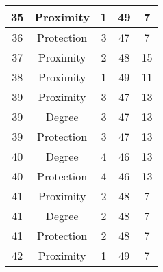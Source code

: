 \documentclass[results.tex]{subfiles}
\begin{document}
\begin{center}
\begin{tabular}{| c || c | c | c | c |}
            \hline
            35                      & Proximity                    & 1                      & 49                      & 7                    \\
            \hline
            36                      & Protection                   & 3                      & 47                      & 7                    \\
            \hline
            37                      & Proximity                    & 2                      & 48                      & 15                   \\
            \hline
            38                      & Proximity                    & 1                      & 49                      & 11                   \\
            \hline
            39                      & Proximity                    & 3                      & 47                      & 13                   \\
            \hline
            39                      & Degree                       & 3                      & 47                      & 13                   \\
            \hline
            39                      & Protection                   & 3                      & 47                      & 13                   \\
            \hline
            40                      & Degree                       & 4                      & 46                      & 13                   \\
            \hline
            40                      & Protection                   & 4                      & 46                      & 13                   \\
            \hline
            41                      & Proximity                    & 2                      & 48                      & 7                    \\
            \hline
            41                      & Degree                       & 2                      & 48                      & 7                    \\
            \hline
            41                      & Protection                   & 2                      & 48                      & 7                    \\
            \hline
            42                      & Proximity                    & 1                      & 49                      & 7                    \\

\end{tabular}
\end{center}
\end{document}
